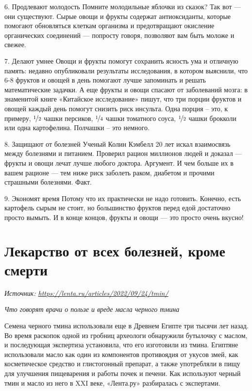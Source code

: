 6. Продлевают молодость Помните молодильные яблочки из сказок? Так вот — они существуют. Сырые овощи и фрукты содержат антиоксиданты, которые помогают обновляться клеткам организма и предотвращают окисление органических соединений — попросту говоря, позволяют вам быть моложе и свежее.

7. Делают умнее Овощи и фрукты помогут сохранить ясность ума и отличную память: недавно опубликовали результаты исследования, в котором выяснили, что 6-8 фруктов и овощей в день помогают лучше запоминать и решать математические задачки. А еще фрукты и овощи спасают от заболеваний мозга: в знаменитой книге «Китайское исследование» пишут, что три порции фруктов и овощей каждый день помогут снизить риск инсульта. Одна порция -- это, к примеру, $\nicefrac{1}{2}$ чашки персиков, $\nicefrac{1}{4}$ чашки томатного соуса, $\nicefrac{1}{2}$ чашки брокколи или одна картофелина. Полчашки -- это немного.

8. Защищают от болезней Ученый Колин Кэмбелл 20 лет искал взаимосвязь между болезнями и питанием. Проверил рацион миллионов людей и доказал — фрукты и овощи лечат лучше любого доктора. Аргумент. И чем больше их в вашем рационе — тем ниже риск заболеть раком, диабетом и прочими страшными болезнями. Факт.

9. Экономят время Потому что их практически не надо готовить. Конечно, есть картофель сырым не стоит, но большинство фруктов перед едой достаточно просто вымыть. И в конце концов, фрукты и овощи — это просто очень вкусно!


\newpage
\section{Лекарство от всех болезней, кроме смерти}
\textit{Источник: \url{https://lenta.ru/articles/2022/09/24/tmin/}}

\textit{Что говорят врачи о пользе и вреде масла черного тмина}

Семена черного тмина использовали еще в Древнем Египте три тысячи лет назад. Во время раскопок одной из гробниц археологи обнаружили бутылочку с маслом, и последующая экспертиза установила, что его изготовили из тмина. Египтяне использовали масло как один из компонентов противоядия от укусов змей, как косметическое средство и глистогонный препарат, а также употребляли в пищу для улучшения пищеварения и работы почек и печени. Как используют черный тмин и масло из него в XXI веке, «Лента.ру» разбиралась с экспертами.

